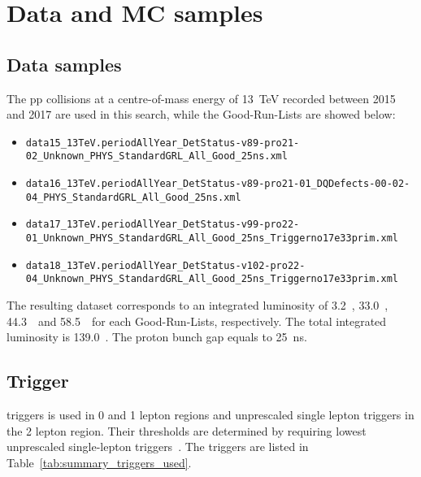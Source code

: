 \chapter{Data and MC samples}
\label{ch:ana-intro}

\section{Data samples}
The pp collisions at a centre-of-mass
energy of 13~TeV recorded between 2015 and 2017 are used in this search, while the Good-Run-Lists are showed below:
\begin{itemize}
        \scriptsize
\item \texttt{data15\_13TeV.periodAllYear\_DetStatus-v89-pro21-02\_Unknown\_PHYS\_StandardGRL\_All\_Good\_25ns.xml}
\item \texttt{data16\_13TeV.periodAllYear\_DetStatus-v89-pro21-01\_DQDefects-00-02-04\_PHYS\_StandardGRL\_All\_Good\_25ns.xml}
\item \texttt{data17\_13TeV.periodAllYear\_DetStatus-v99-pro22-01\_Unknown\_PHYS\_StandardGRL\_All\_Good\_25ns\_Triggerno17e33prim.xml}
\item \texttt{data18\_13TeV.periodAllYear\_DetStatus-v102-pro22-04\_Unknown\_PHYS\_StandardGRL\_All\_Good\_25ns\_Triggerno17e33prim.xml}
\end{itemize}
The resulting dataset corresponds to an integrated luminosity of 3.2~\ifb, 33.0~\ifb, 44.3~\ifb\ and 58.5~\ifb\ for each Good-Run-Lists, respectively. The total integrated luminosity is 139.0~\ifb. The proton bunch gap equals to 25~ns.


\section{Trigger}
\label{sec:trigger}

\met triggers is used in 0 and 1 lepton regions and unprescaled single lepton triggers in the 2 lepton region. 
Their thresholds are determined by requiring lowest unprescaled single-lepton triggers~\cite{lowest_unprescaled_triggers}. 
The triggers are listed in Table~\ref{tab:summary_triggers_used}. 

